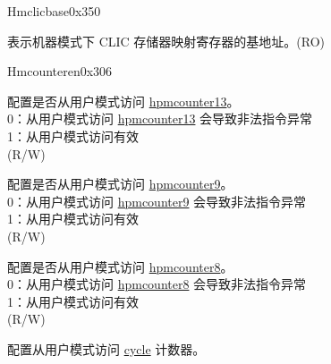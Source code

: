 \begin{register}{H}{mclicbase}{0x350}\label{regdesc:MCLICBASE_REG}
%
\regnewline%
\begin{regdesc}\begin{reglist}
\label{fielddesc:MCLICBASE}\item [MCLICBASE] 表示机器模式下 CLIC 存储器映射寄存器的基地址。(RO)
\end{reglist}\end{regdesc}
\end{register}








\begin{register}{H}{mcounteren}{0x306}\label{regdesc:MCOUNTEREN}
%
%
%
%
%
%
%
%
%
\regnewline%
\begin{regdesc}\begin{reglist}
\label{fielddesc:MCOUNTEREN_HPM_13}\item [{HPM13}] 配置是否从用户模式访问 \hyperref[regdesc:HPMCOUNTER13] {hpmcounter13}。\\
0：从用户模式访问 \hyperref[regdesc:HPMCOUNTER13] {hpmcounter13} 会导致非法指令异常\\
1：从用户模式访问有效\\
(R/W)
\label{fielddesc:MCOUNTEREN_HPM9}\item [{HPM9}] 配置是否从用户模式访问 \hyperref[regdesc:HPMCOUNTER9] {hpmcounter9}。\\
0：从用户模式访问 \hyperref[regdesc:HPMCOUNTER9] {hpmcounter9} 会导致非法指令异常\\
1：从用户模式访问有效\\
(R/W)
\label{fielddesc:MCOUNTEREN_HPM_8}\item [{HPM8}] 配置是否从用户模式访问 \hyperref[regdesc:HPMCOUNTER8] {hpmcounter8}。\\
0：从用户模式访问 \hyperref[regdesc:HPMCOUNTER13] {hpmcounter8} 会导致非法指令异常\\
1：从用户模式访问有效\\
(R/W)
\label{fielddesc:MCOUNTEREN_CY}\item [CY] 配置从用户模式访问 \hyperref[regdesc:CYCLE]{cycle} 计数器。 \\

\end{reglist}
\end{regdesc}
\end{register}
